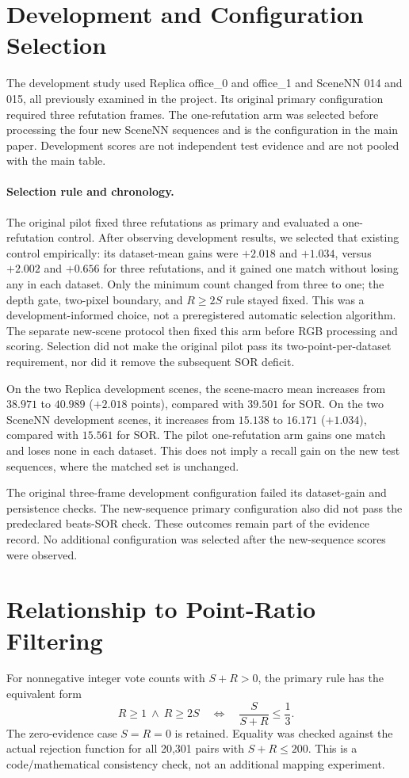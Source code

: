\section{Development and Configuration Selection}
The development study used Replica office\_0 and office\_1 and SceneNN 014 and 015, all previously examined in the project. Its original primary configuration required three refutation frames. The one-refutation arm was selected before processing the four new SceneNN sequences and is the \ours{} configuration in the main paper. Development scores are not independent test evidence and are not pooled with the main table.



\paragraph{Selection rule and chronology.} The original pilot fixed three refutations as primary and evaluated a one-refutation control. After observing development results, we selected that existing control empirically: its dataset-mean gains were $+2.018$ and $+1.034$, versus $+2.002$ and $+0.656$ for three refutations, and it gained one match without losing any in each dataset. Only the minimum count changed from three to one; the depth gate, two-pixel boundary, and $R\geq2S$ rule stayed fixed. This was a development-informed choice, not a preregistered automatic selection algorithm. The separate new-scene protocol then fixed this arm before RGB processing and scoring. Selection did not make the original pilot pass its two-point-per-dataset requirement, nor did it remove the subsequent SOR deficit.

On the two Replica development scenes, the scene-macro mean increases from $38.971$ to $40.989$ ($+2.018$ points), compared with $39.501$ for SOR. On the two SceneNN development scenes, it increases from $15.138$ to $16.171$ ($+1.034$), compared with $15.561$ for SOR. The pilot one-refutation arm gains one match and loses none in each dataset. This does not imply a recall gain on the new test sequences, where the matched set is unchanged.

The original three-frame development configuration failed its dataset-gain and persistence checks. The new-sequence primary configuration also did not pass the predeclared beats-SOR check. These outcomes remain part of the evidence record. No additional configuration was selected after the new-sequence scores were observed.

\section{Relationship to Point-Ratio Filtering}
For nonnegative integer vote counts with $S+R>0$, the primary rule has the equivalent form
\begin{equation}
R\geq1\ \land\ R\geq2S\quad\Longleftrightarrow\quad
\frac{S}{S+R}\leq\frac13.
\end{equation}
The zero-evidence case $S=R=0$ is retained. Equality was checked against the actual rejection function for all 20,301 pairs with $S+R\leq200$. This is a code/mathematical consistency check, not an additional mapping experiment.

